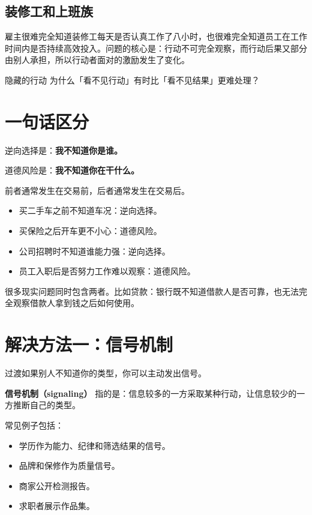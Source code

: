 \documentclass[10pt,a4paper]{ctexart}
\newcommand{\transitionnote}[1]{\begin{conceptbox}{过渡}#1\end{conceptbox}}
\begin{document}
\subsection{装修工和上班族}

雇主很难完全知道装修工每天是否认真工作了八小时，也很难完全知道员工在工作时间内是否持续高效投入。问题的核心是：行动不可完全观察，而行动后果又部分由别人承担，所以行动者面对的激励发生了变化。

\begin{discussionbox}{隐藏的行动}
为什么「看不见行动」有时比「看不见结果」更难处理？
\end{discussionbox}

\section{一句话区分}

逆向选择是：\textbf{我不知道你是谁。}

道德风险是：\textbf{我不知道你在干什么。}

前者通常发生在交易前，后者通常发生在交易后。

\begin{itemize}
  \item 买二手车之前不知道车况：逆向选择。
  \item 买保险之后开车更不小心：道德风险。
  \item 公司招聘时不知道谁能力强：逆向选择。
  \item 员工入职后是否努力工作难以观察：道德风险。
\end{itemize}

很多现实问题同时包含两者。比如贷款：银行既不知道借款人是否可靠，也无法完全观察借款人拿到钱之后如何使用。

\section{解决方法一：信号机制}

\transitionnote{如果别人不知道你的类型，你可以主动发出信号。}

\textbf{信号机制（signaling）} 指的是：信息较多的一方采取某种行动，让信息较少的一方推断自己的类型。

常见例子包括：
\begin{itemize}
  \item 学历作为能力、纪律和筛选结果的信号。
  \item 品牌和保修作为质量信号。
  \item 商家公开检测报告。
  \item 求职者展示作品集。
\end{itemize}
\end{document}
